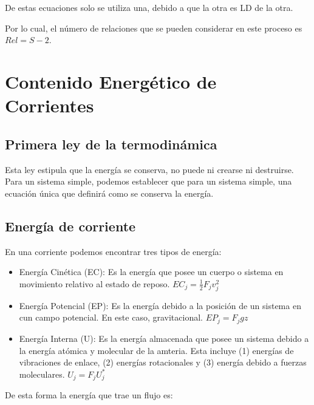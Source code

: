 
De estas ecuaciones solo se utiliza una, debido a que la otra es LD de la otra.

Por lo cual, el número de relaciones que se pueden considerar en este proceso es $Rel=S-2$.

\clearpage
\section{Contenido Energético de Corrientes}

\subsection{Primera ley de la termodinámica}

Esta ley estipula que la energía se conserva, no puede ni crearse ni destruirse. Para un sistema simple, podemos establecer que para un sistema simple, una ecuación única que definirá como se conserva la energía.

\subsection{Energía de corriente}

En una corriente podemos encontrar tres tipos de energía:
\begin{itemize}
    \item Energía Cinética (EC): Es la energía que posee un cuerpo o sistema en movimiento relativo al estado de reposo. $EC_j=\frac{1}{2}F_jv_j^2$
    \item Energía Potencial (EP): Es la energía debido a la posición de un sistema en cun campo potencial. En este caso, gravitacional. $EP_j=F_jgz$
    \item Energía Interna (U): Es la energía almacenada que posee un sistema debido a la energía atómica y molecular de la amteria. Esta incluye (1) energías de vibraciones de enlace, (2) energías rotacionales y (3) energía debido a fuerzas moleculares. $U_j=F_jU_j^*$
\end{itemize}
De esta forma la energía que trae un flujo es:

